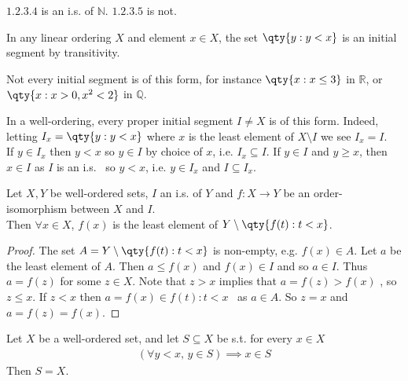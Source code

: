 \begin{example}
    $\qty{1, 2, 3, 4}$ is an i.s. of $\mathbb{N}$.
    $\qty{1, 2, 3, 5}$ is not.
\end{example}

\begin{remark}
    In any linear ordering $X$ and element $x \in X$, the set $\qty{y : y < x}$ is an initial segment by transitivity.

    Not every initial segment is of this form, for instance $\qty{x : x \leq 3}$ in $\mathbb R$, or $\qty{x : x > 0, x^2 < 2}$ in $\mathbb Q$.
\end{remark}

\begin{remark}
    In a well-ordering, every proper initial segment $I \neq X$ is of this form.
    Indeed, letting $I_x = \qty{y : y < x}$ where $x$ is the least element of $X \setminus I$ we see $I_x = I$. \\
    If $y \in I_x$ then $y < x$ so $y \in I$ by choice of $x$, i.e. $I_x \subseteq I$.
    If $y \in I$ and $y \geq x$, then $x \in I$ as $I$ is an i.s. \Lightning \ so $y < x$, i.e. $y \in I_x$ and $I \subseteq I_x$.
\end{remark}

\begin{lemma} \label{lem:1}
    Let $X, Y$ be well-ordered sets, $I$ an i.s. of $Y$ and $f : X \to Y$ be an order-isomorphism between $X$ and $I$. \\
    Then $\forall x \in X$, $f(x)$ is the least element of $Y \setminus \qty{f(t) : t < x}$.
\end{lemma}

\begin{proof}
    The set $A = Y \setminus \qty{f(t) : t < x}$ is non-empty, e.g. $f(x) \in A$.
    Let $a$ be the least element of $A$.
    Then $a \leq f(x)$ and $f(x) \in I$ and so $a \in I$.
    Thus $a = f(z)$ for some $z \in X$.
    Note that $z > x$ implies that $a = f(z) > f(x)$ \Lightning, so $z \leq x$.
    If $z < x$ then $a = f(x) \in {f(t) : t < x}$ \Lightning \ as $a \in A$.
    So $z = x$ and $a = f(z) = f(x)$.
\end{proof}

\begin{proposition}
    Let $X$ be a well-ordered set, and let $S \subseteq X$ be s.t. for every $x \in X$
    \begin{align*}
    (\forall y < x,\, y \in S) \implies x \in S
    \end{align*}
    Then $S = X$.
\end{proposition}

